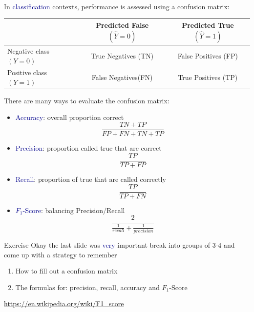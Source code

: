 \documentclass[table,dvipsnames]{beamer}
\newcommand{\keywd}{\textcolor{myorange}}
\newcommand{\highlt}{\textcolor{darkblue}}
\begin{document}
\begin{frame}
\footnotesize
In \highlt{classification} contexts, performance is assessed using a \keywd{confusion matrix}:
\begin{table}
\begin{tabular}{|l|c|c|}
\hline
                         & Predicted False $(\hat Y = 0)$      & Predicted True $(\hat Y = 1)$ \\
\hline      
Negative class $(Y = 0)$           & True Negatives (TN)                       & False Positives (FP)          \\
Positive class $(Y = 1)$           & False Negatives(FN)                       & True Positives (TP)           \\
\hline
\end{tabular}
\end{table}

There are many ways to evaluate the confusion matrix:
\begin{itemize}
 \item \highlt{Accuracy}: overall proportion correct
 \begin{equation*}
 \frac{TN+TP}{FP+FN+TN+TP}
 \end{equation*}
 \item \highlt{Precision}: proportion called true that are correct
 \begin{equation*}
 \frac{TP}{TP+FP}  
 \end{equation*}
 \item \highlt{Recall}: proportion of true that are called correctly
 \begin{equation*}
  \frac{TP}{TP+FN}
 \end{equation*}
 \item \highlt{$F_1$-Score}: balancing Precision/Recall
 \begin{equation*}
  \frac{2}{ \frac{1}{recall} + \frac{1}{precision}  }
 \end{equation*}
\end{itemize}
\end{frame}

\begin{frame}
\begin{block}{Exercise}
 Okay the last slide was \highlt{very} important break into groups of 3-4 and come up with a strategy to remember
 \begin{enumerate}
  \item How to fill out a confusion matrix
  \item The formulas for: precision, recall, accuracy and $F_{1}$-Score
 \end{enumerate}
 
\href{https://en.wikipedia.org/wiki/F1\_score}{https://en.wikipedia.org/wiki/F1\_score}
\end{block}
\end{frame}
\end{document}
